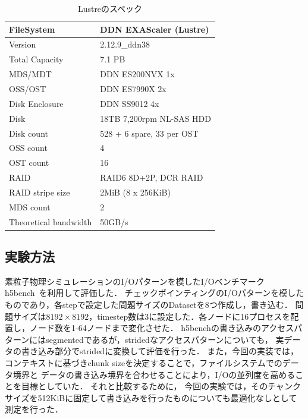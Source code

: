 \documentclass[submit,techrep,noauthor]{ipsj}
\begin{document}
\begin{table}[t]
	\caption{Lustreのスペック}
	\label{tab:lustre}
	\centering
	
	\begin{tabularx}{\linewidth}{Y|Y}
		\hline \hline
		FileSystem            & DDN EXAScaler (Lustre)    \\ \hline
		Version               & 2.12.9\_ddn38             \\ \hline
		Total Capacity        & 7.1 PB                    \\ \hline
		MDS/MDT               & DDN ES200NVX 1x           \\ \hline
		OSS/OST               & DDN ES7990X 2x            \\ \hline
		Disk Enclosure        & DDN SS9012 4x             \\ \hline
		Disk                  & 18TB 7,200rpm NL-SAS HDD  \\ \hline
		Disk count            & 528 + 6 spare, 33 per OST \\ \hline 
		OSS count             & 4                         \\ \hline
		OST count             & 16                        \\ \hline
		RAID                  & RAID6 8D+2P, DCR RAID     \\ \hline
		RAID stripe size      & 2MiB (8 x 256KiB)         \\ \hline
		MDS count             & 2                         \\ \hline
		Theoretical bandwidth & 50GB/s                    \\ \hline
	\end{tabularx}
\end{table}

\subsection{実験方法}
素粒子物理シミュレーションのI/Oパターンを模したI/Oベンチマークh5bench~\cite{h5bench}を利用して評価した．
チェックポインティングのI/Oパターンを模したものであり，各stepで設定した問題サイズのDatasetを8つ作成し，書き込む．
問題サイズは$8192 \times 8192$，timestep数は3に設定した．各ノードに16プロセスを配置し，ノード数を1-64ノードまで変化させた．
h5benchの書き込みのアクセスパターンにはsegmentedであるが，stridedなアクセスパターンについても，
実データの書き込み部分でstridedに変換して評価を行った．
また，今回の実装では，コンテキストに基づきchunk sizeを決定することで，ファイルシステムでのデータ境界と
データの書き込み境界を合わせることにより，I/Oの並列度を高めることを目標としていた．
それと比較するために，
今回の実験では，そのチャンクサイズを512KiBに固定して書き込みを行ったものについても最適化なしとして測定を行った．
\end{document}

